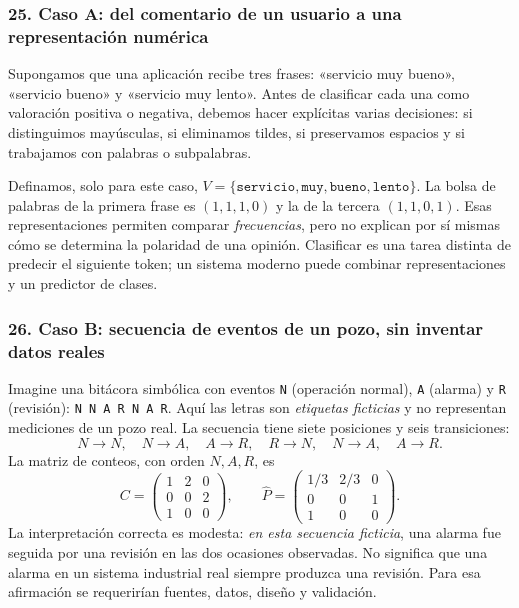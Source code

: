 \subsubsection*{25. Caso A: del comentario de un usuario a una representación numérica}
Supongamos que una aplicación recibe tres frases: «servicio muy bueno», «servicio bueno» y «servicio muy lento». Antes de clasificar cada una como valoración positiva o negativa, debemos hacer explícitas varias decisiones: si distinguimos mayúsculas, si eliminamos tildes, si preservamos espacios y si trabajamos con palabras o subpalabras.

\begin{center}
\end{center}
Definamos, solo para este caso, $V=\{\texttt{servicio},\texttt{muy},\texttt{bueno},\texttt{lento}\}$. La bolsa de palabras de la primera frase es $(1,1,1,0)$ y la de la tercera $(1,1,0,1)$. Esas representaciones permiten comparar \emph{frecuencias}, pero no explican por sí mismas cómo se determina la polaridad de una opinión. Clasificar es una tarea distinta de predecir el siguiente token; un sistema moderno puede combinar representaciones y un predictor de clases.

\subsubsection*{26. Caso B: secuencia de eventos de un pozo, sin inventar datos reales}
Imagine una bitácora simbólica con eventos \texttt{N} (operación normal), \texttt{A} (alarma) y \texttt{R} (revisión): \texttt{N N A R N A R}. Aquí las letras son \emph{etiquetas ficticias} y no representan mediciones de un pozo real. La secuencia tiene siete posiciones y seis transiciones:
\[
N\to N,\quad N\to A,\quad A\to R,\quad R\to N,\quad N\to A,\quad A\to R.
\]
La matriz de conteos, con orden $N,A,R$, es
\[
C=\begin{pmatrix}1&2&0\\0&0&2\\1&0&0\end{pmatrix},\qquad
\widehat P=\begin{pmatrix}1/3&2/3&0\\0&0&1\\1&0&0\end{pmatrix}.
\]
La interpretación correcta es modesta: \emph{en esta secuencia ficticia}, una alarma fue seguida por una revisión en las dos ocasiones observadas. No significa que una alarma en un sistema industrial real siempre produzca una revisión. Para esa afirmación se requerirían fuentes, datos, diseño y validación.

